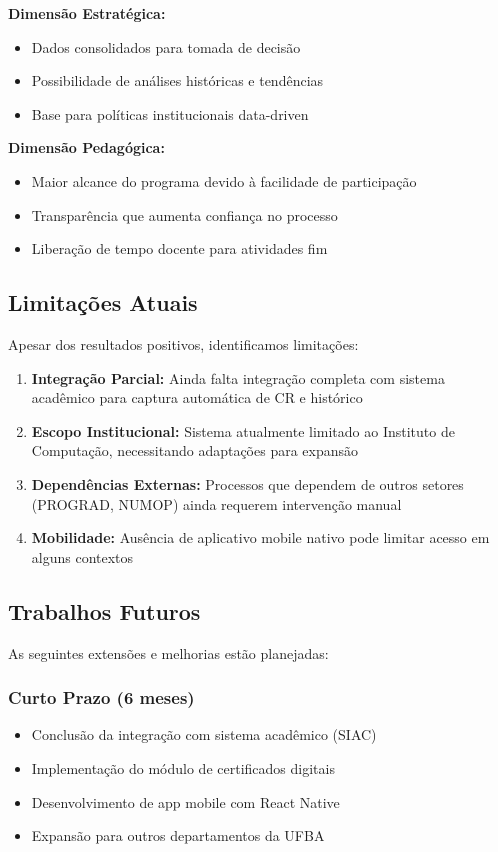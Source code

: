 \documentclass[portuguese]{sbc2025}%
\begin{document}
\textbf{Dimensão Estratégica:}
\begin{itemize}
  \item Dados consolidados para tomada de decisão
  \item Possibilidade de análises históricas e tendências
  \item Base para políticas institucionais data-driven
\end{itemize}

\textbf{Dimensão Pedagógica:}
\begin{itemize}
  \item Maior alcance do programa devido à facilidade de participação
  \item Transparência que aumenta confiança no processo
  \item Liberação de tempo docente para atividades fim
\end{itemize}

\subsection{Limitações Atuais}

Apesar dos resultados positivos, identificamos limitações:

\begin{enumerate}
  \item \textbf{Integração Parcial:} Ainda falta integração completa com sistema acadêmico para captura automática de CR e histórico

  \item \textbf{Escopo Institucional:} Sistema atualmente limitado ao Instituto de Computação, necessitando adaptações para expansão

  \item \textbf{Dependências Externas:} Processos que dependem de outros setores (PROGRAD, NUMOP) ainda requerem intervenção manual

  \item \textbf{Mobilidade:} Ausência de aplicativo mobile nativo pode limitar acesso em alguns contextos
\end{enumerate}

\subsection{Trabalhos Futuros}

As seguintes extensões e melhorias estão planejadas:

\subsubsection{Curto Prazo (6 meses)}
\begin{itemize}
  \item Conclusão da integração com sistema acadêmico (SIAC)
  \item Implementação do módulo de certificados digitais
  \item Desenvolvimento de app mobile com React Native
  \item Expansão para outros departamentos da UFBA
\end{itemize}
\end{document}
